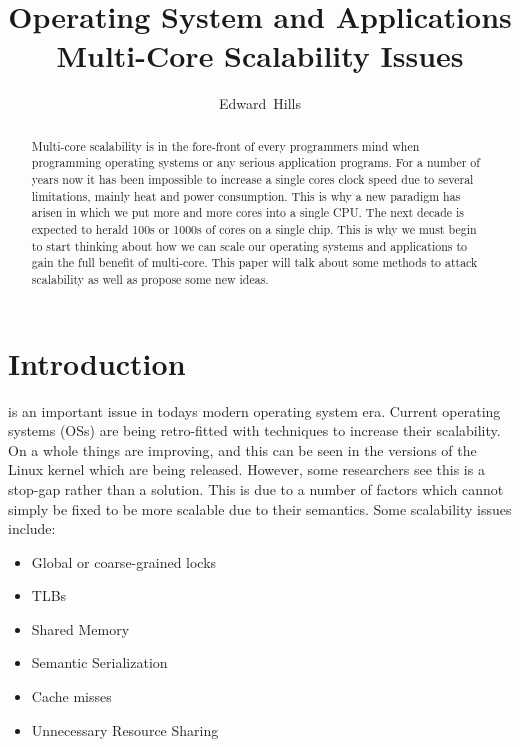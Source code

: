 \documentclass[journal]{IEEEtran}
\begin{document}
\title{Operating System and Applications Multi-Core Scalability Issues}

\author{Edward~Hills}

\maketitle

\begin{abstract}

Multi-core scalability is in the fore-front of every programmers mind when programming operating systems or any serious application programs. For a number of years now it has been impossible to increase a single cores clock speed due to several limitations, mainly heat and power consumption. This is why a new paradigm has arisen in which we put more and more cores into a single CPU. The next decade is expected to herald 100s or 1000s of cores on a single chip. This is why we must begin to start thinking about how we can scale our operating systems and applications to gain the full benefit of multi-core. This paper will talk about some methods to attack scalability as well as propose some new ideas.

\end{abstract}

\section{Introduction}
 is an important issue in todays modern operating system era. Current operating systems (OSs) are being retro-fitted with techniques to increase their scalability. On a whole things are improving, and this can be seen in the versions of the Linux kernel which are being released. However, some researchers see this is a stop-gap rather than a solution. This is due to a number of factors which cannot simply be fixed to be more scalable due to their semantics. Some scalability issues include:

\begin{itemize}
\item Global or coarse-grained locks
\item TLBs
\item Shared Memory
\item Semantic Serialization
\item Cache misses
\item Unnecessary Resource Sharing
\end{itemize}
\end{document}
